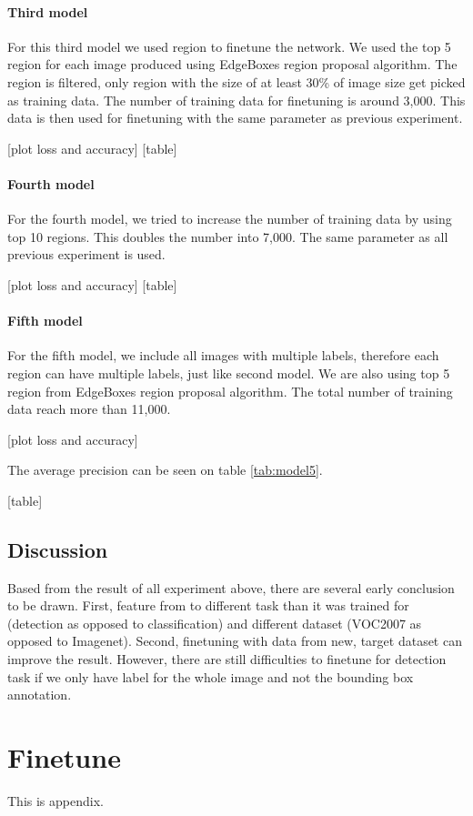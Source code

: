 \documentclass[a4paper,11pt]{kth-mag}
\begin{document}
\subsubsection{Third model}
For this third model we used region to finetune the network. We used the top 5 region for each image produced using EdgeBoxes region proposal algorithm. The region is filtered, only region with the size of at least 30\% of image size get picked as training data. The number of training data for finetuning is around 3,000. This data is then used for finetuning with the same parameter as previous experiment.

[plot loss and accuracy]
[table]

\subsubsection{Fourth model}
For the fourth model, we tried to increase the number of training data by using top 10 regions. This doubles the number into 7,000. The same parameter as all previous experiment is used.

[plot loss and accuracy]
[table]

\subsubsection{Fifth model}
For the fifth model, we include all images with multiple labels, therefore each region can have multiple labels, just like second model. We are also using top 5 region from EdgeBoxes region proposal algorithm. The total number of training data reach more than 11,000.

[plot loss and accuracy]

The average precision can be seen on table \ref{tab:model5}.

[table]

\section{Discussion}
Based from the result of all experiment above, there are several early conclusion to be drawn. First, feature from to different task than it was trained for (detection as opposed to classification) and different dataset (VOC2007 as opposed to Imagenet). Second, finetuning with data from new, target dataset can improve the result. However, there are still difficulties to finetune for detection task if we only have label for the whole image and not the bounding box annotation.




\appendix
\addappheadtotoc
\chapter{Finetune}\label{appA}

This is appendix.
\end{document}
